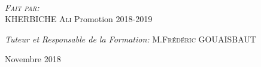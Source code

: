 \documentclass[12pt, a4paper, openany]{report}
\begin{document}
\begin{titlepage}
\begin{sffamily}
\begin{center}
    \\[1cm]
    \begin{minipage}{0.4\textwidth}
      \begin{flushleft} \large
         \textsc{\emph {Fait par:} \\KHERBICHE Ali}  
          \newline
          Promotion 2018-2019 \\
      \end{flushleft}
    \end{minipage}
    \begin{minipage}{0.4\textwidth}
      \begin{flushright} \large
        \emph{Tuteur et}
        \emph{Responsable de la Formation:} \textsc{M.Frédéric GOUAISBAUT}
      \end{flushright}
    \end{minipage}
    \vfill
    {\large Novembre 2018}
  \end{center}
  \end{sffamily}                
  \end{titlepage}  
\makeatother
   
\renewcommand{\contentsname}{Sommaire}
\tableofcontents
\listoffigures
\listoftables

 
 

\end{document}
